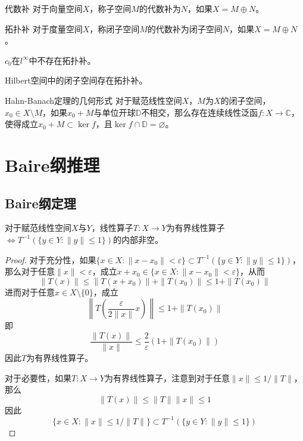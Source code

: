 \documentclass[lang = cn, scheme = chinese, thmcnt = section]{elegantbook}
\newcommand{\C}{\mathbb{C}}  		   %
\newcommand{\sub}{\subset}             %
\begin{document}
\begin{definition}{代数补}
	对于向量空间$X$，称子空间$M$的代数补为$N$，如果$X=M\oplus N$。
\end{definition}

\begin{definition}{拓扑补}
	对于度量空间$X$，称闭子空间$M$的代数补为闭子空间$N$，如果$X=M\oplus N$。
\end{definition}

\begin{example}
	$c_{0}$在$l^\infty$中不存在拓扑补。
\end{example}

\begin{example}
	Hilbert空间中的闭子空间存在拓扑补。
\end{example}

\begin{theorem}{Hahn-Banach定理的几何形式}
	对于赋范线性空间$X$，$M$为$X$的闭子空间，$x_0\in X\setminus M$，如果$x_0+M$与单位开球$\mathbb{D}$不相交，那么存在连续线性泛函$f:X\to\C$，使得成立$x_0+M\sub\ker f$，且$\ker f\cap \mathbb{D}=\varnothing$。
\end{theorem}

\section{Baire纲推理}

\subsection{Baire纲定理}

\begin{proposition}
	对于赋范线性空间$X$与$Y$，线性算子$T:X\to Y$为有界线性算子$\iff T^{-1}(\{ y\in Y:\|y\|\le 1 \})$的内部非空。
\end{proposition}

\begin{proof}
	对于充分性，如果$\{ x\in X:\|x-x_0\|<\varepsilon \}\sub T^{-1}(\{ y\in Y:\|y\|\le 1 \})$，那么对于任意$\|x\|<\varepsilon$，成立$x+x_0\in \{ x\in X:\|x-x_0\|<\varepsilon \}$，从而
	$$
	\|T(x)\|\le \|T(x+x_0)\|+\|T(x_0)\|\le 1+\|T(x_0)\|
	$$
	进而对于任意$x\in X\setminus\{0\}$，成立
	$$
	\left\| T\left(\frac{\varepsilon}{2\|x\|}x\right) \right\| \le 1+\|T(x_0)\|
	$$
	即
	$$
	\frac{\|T(x)\|}{\|x\|}\le\frac{2}{\varepsilon}(1+\|T(x_0)\|)
	$$
	因此$T$为有界线性算子。
	
	对于必要性，如果$T:X\to Y$为有界线性算子，注意到对于任意$\|x\|\le1/\|T\|$，那么
	$$
	\|T(x)\|\le\|T\|\|x\|\le 1
	$$
	因此
	$$
	\{ x\in X:\|x\|\le1/\|T\| \}\sub T^{-1}(\{ y\in Y:\|y\|\le 1 \})
	$$
\end{proof}
\end{document}
